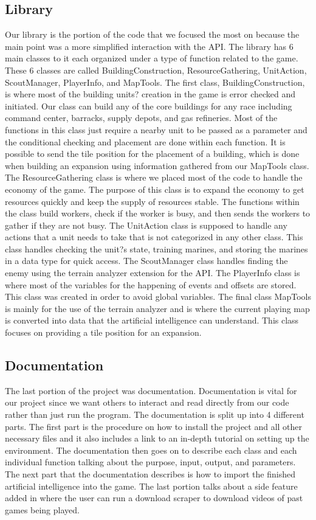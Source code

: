 \documentclass[10pt,letterpaper,onecolumn,draftclsnofoot]{IEEEtran}
\begin{document}
\subsection{Library}
Our library is the portion of the code that we focused the most on because the main point was a more simplified interaction with the API. The library has 6 main classes to it each organized under a type of function related to the game. These 6 classes are called BuildingConstruction, ResourceGathering, UnitAction, ScoutManager, PlayerInfo, and MapTools. The first class, BuildingConstruction, is where most of the building units? creation in the game is error checked and initiated. Our class can build any of the core buildings for any race including command center, barracks, supply depots, and gas refineries. Most of the functions in this class just require a nearby unit to be passed as a parameter and the conditional checking and placement are done within each function. It is possible to send the tile position for the placement of a building, which is done when building an expansion using information gathered from our MapTools class. The ResourceGathering class is where we placed most of the code to handle the economy of the game. The purpose of this class is to expand the economy to get resources quickly and keep the supply of resources stable. The functions within the class build workers, check if the worker is busy, and then sends the workers to gather if they are not busy. The UnitAction class is supposed to handle any actions that a unit needs to take that is not categorized in any other class. This class handles checking the unit?s state, training marines, and storing the marines in a data type for quick access. The ScoutManager class handles finding the enemy using the terrain analyzer extension for the API. The PlayerInfo class is where most of the variables for the happening of events and offsets are stored. This class was created in order to avoid global variables. The final class MapTools is mainly for the use of the terrain analyzer and is where the current playing map is converted into data that the artificial intelligence can understand. This class focuses on providing a tile position for an expansion.
\subsection{Documentation}
The last portion of the project was documentation. Documentation is vital for our project since we want others to interact and read directly from our code rather than just run the program. The documentation is split up into 4 different parts. The first part is the procedure on how to install the project and all other necessary files and it also includes a link to an in-depth tutorial on setting up the environment. The documentation then goes on to describe each class and each individual function talking about the purpose, input, output, and parameters. The next part that the documentation describes is how to import the finished artificial intelligence into the game. The last portion talks about a side feature added in where the user can run a download scraper to download videos of past games being played.
\end{document}
